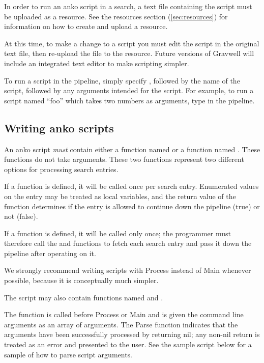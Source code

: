 In order to run an anko script in a search, a text file containing the
script must be uploaded as a resource. See the resources section (\ref{sec:resources}) for
information on how to create and upload a resource.

At this time, to make a change to a script you must edit the script in
the original text file, then re-upload the file to the resource. Future
versions of Gravwell will include an integrated text editor to make
scripting simpler.

To run a script in the pipeline, simply specify , followed by the name of the
script, followed by any arguments intended for the script. For example,
to run a script named ``foo'' which takes two numbers as arguments,
type  in the pipeline.

\subsection{Writing anko scripts}

An anko script \emph{must} contain either a function named  or
a function named . These functions do not take arguments. These
two functions represent two different options for processing search
entries.

If a  function is defined, it will be called once per search
entry. Enumerated values on the entry may be treated as local variables,
and the return value of the  function determines if the entry
is allowed to continue down the pipeline (true) or not (false).

If a  function is defined, it will be called only once; the
programmer must therefore call the  and
 functions to fetch each search entry and pass it down the
pipeline after operating on it.

We strongly recommend writing scripts with Process instead of
Main whenever possible, because it is conceptually much simpler.

The script may also contain functions named  and
.

The  function is called before Process or Main and is
given the command line arguments as an array of arguments. The
Parse function indicates that the arguments have been successfully
processed by returning nil; any non-nil return is treated as an error
and presented to the user. See the sample script below for a sample of
how to parse script arguments.

